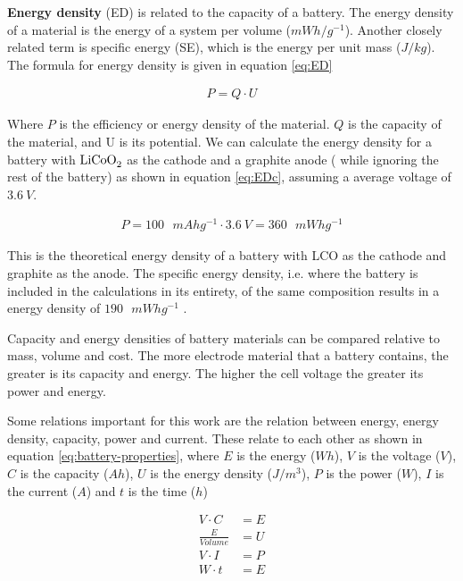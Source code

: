 \textbf{Energy density} (\ac{ED}) is related to the capacity of a battery. The energy density of a material is the energy of a system per volume ($\si{mWh/g^{-1}}$). Another closely related term is specific energy (\ac{SE}), which is the energy per unit mass ($\si{J/kg}$). The formula for energy density is given in equation \ref{eq:ED}
	
	\begin{align}\label{eq:ED}
	P = Q \cdot U
	\end{align}

Where $P$ is the efficiency or energy density of the material. $Q$ is the capacity of the material, and U is its potential. We can calculate the energy density for a battery with $\ce{LiCoO_2}$  as the cathode and a graphite  anode ( while ignoring the rest of the battery) as shown in equation \ref{eq:EDc}, assuming a average voltage of $\SI{3.6}{V}$.

\begin{align}\label{eq:EDc}
P = 100\text{ }\si{mAhg^{-1}} \cdot \SI{3.6}{V}  = 360 \text{ } \si{mWhg^{-1}}
\end{align}

This is the theoretical energy density of a battery with LCO as the cathode and graphite as the anode. The specific energy density, i.e. where the battery is included in the calculations in its entirety, of the same composition results in a energy density of $190\text{ } \si{mWhg^{-1}}$ \cite{srinivasan2008batteries}.
	
 	Capacity and energy densities of battery materials can be compared relative to mass, volume and cost. The more electrode material that a battery contains, the greater is its capacity and energy. The higher the cell voltage the greater its power and energy.
	

Some relations important for this work are the relation between energy, energy density, capacity, power and current. These relate to each other as shown in equation \ref{eq:battery-properties}, where $E$ is the energy ($\si{Wh}$), $V$ is the voltage ($\si{V}$), $C$ is the capacity ($\si{Ah}$), $U$ is the energy density ($\si{J/m^3}$), $P$ is the power ($\si{W}$), $I$ is the current ($\si{A}$) and $t$ is the time ($\si{h}$)

\begin{align}\label{eq:battery-properties}
V \cdot C &= E \\
\frac{E}{Volume} &= U  \\
V \cdot I &= P \\
W \cdot t &= E 
\end{align}




